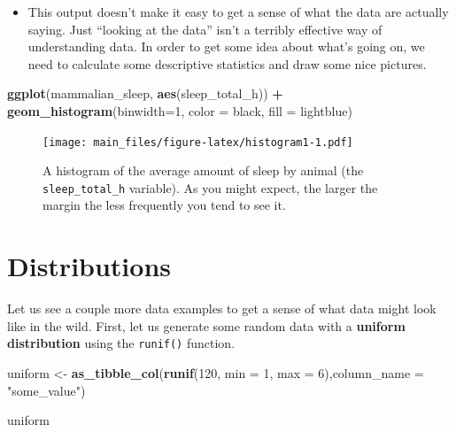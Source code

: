 \documentclass[
]{book}
\newenvironment{Shaded}{\begin{snugshade}}{\end{snugshade}}
\newcommand{\AttributeTok}[1]{\textcolor[rgb]{0.13,0.29,0.53}{#1}}
\newcommand{\DecValTok}[1]{\textcolor[rgb]{0.00,0.00,0.81}{#1}}
\newcommand{\FunctionTok}[1]{\textcolor[rgb]{0.13,0.29,0.53}{\textbf{#1}}}
\newcommand{\NormalTok}[1]{#1}
\newcommand{\OtherTok}[1]{\textcolor[rgb]{0.56,0.35,0.01}{#1}}
\newcommand{\SpecialCharTok}[1]{\textcolor[rgb]{0.81,0.36,0.00}{\textbf{#1}}}
\newcommand{\StringTok}[1]{\textcolor[rgb]{0.31,0.60,0.02}{#1}}
\providecommand{\tightlist}{%
  \setlength{\itemsep}{0pt}\setlength{\parskip}{0pt}}
\begin{document}
\begin{itemize}
\tightlist
\item
  This output doesn't make it easy to get a sense of what the data are actually saying. Just ``looking at the data'' isn't a terribly effective way of understanding data. In order to get some idea about what's going on, we need to calculate some descriptive statistics and draw some nice pictures.
\end{itemize}

\begin{Shaded}
\begin{Highlighting}[]
\FunctionTok{ggplot}\NormalTok{(mammalian\_sleep, }\FunctionTok{aes}\NormalTok{(sleep\_total\_h)) }\SpecialCharTok{+}
        \FunctionTok{geom\_histogram}\NormalTok{(}\AttributeTok{binwidth=}\DecValTok{1}\NormalTok{,}
                       \AttributeTok{color =} \StringTok{\textquotesingle{}black\textquotesingle{}}\NormalTok{,}
                       \AttributeTok{fill =} \StringTok{\textquotesingle{}lightblue\textquotesingle{}}\NormalTok{)}
\end{Highlighting}
\end{Shaded}

\begin{figure}
\centering
\texttt{[image: main\_files/figure-latex/histogram1-1.pdf]}
\caption{\label{fig:histogram1}A histogram of the average amount of sleep by animal (the \texttt{sleep\_total\_h} variable). As you might expect, the larger the margin the less frequently you tend to see it.}
\end{figure}

\hypertarget{distributions}{%
\section{Distributions}\label{distributions}}

Let us see a couple more data examples to get a sense of what data might look like in the wild. First, let us generate some random data with a \textbf{uniform distribution} using the \texttt{runif()} function.

\begin{Shaded}
\begin{Highlighting}[]
\NormalTok{uniform }\OtherTok{\textless{}{-}} \FunctionTok{as\_tibble\_col}\NormalTok{(}\FunctionTok{runif}\NormalTok{(}\DecValTok{120}\NormalTok{, }\AttributeTok{min =} \DecValTok{1}\NormalTok{, }\AttributeTok{max =} \DecValTok{6}\NormalTok{),}\AttributeTok{column\_name =} \StringTok{"some\_value"}\NormalTok{)}

\NormalTok{uniform}
\end{Highlighting}
\end{Shaded}
\end{document}
